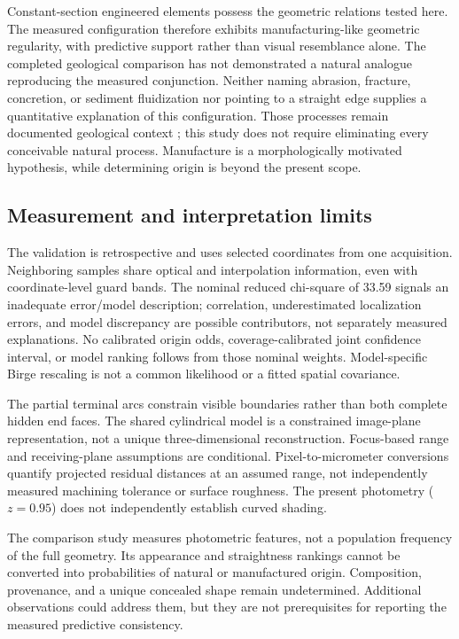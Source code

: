 \documentclass[11pt,letterpaper]{article}
\begin{document}
Constant-section engineered elements possess the geometric relations tested here. The measured configuration therefore exhibits manufacturing-like geometric regularity, with predictive support rather than visual resemblance alone. The completed geological comparison has not demonstrated a natural analogue reproducing the measured conjunction. Neither naming abrasion, fracture, concretion, or sediment fluidization nor pointing to a straight edge supplies a quantitative explanation of this configuration. Those processes remain documented geological context \cite{bridges2014,loope2011,rubin2017,chan2004,wiens2017}; this study does not require eliminating every conceivable natural process. Manufacture is a morphologically motivated hypothesis, while determining origin is beyond the present scope.

\subsection{Measurement and interpretation limits}
\label{sec:limits}

The validation is retrospective and uses selected coordinates from one acquisition. Neighboring samples share optical and interpolation information, even with coordinate-level guard bands. The nominal reduced chi-square of 33.59 signals an inadequate error/model description; correlation, underestimated localization errors, and model discrepancy are possible contributors, not separately measured explanations. No calibrated origin odds, coverage-calibrated joint confidence interval, or model ranking follows from those nominal weights. Model-specific Birge rescaling is not a common likelihood or a fitted spatial covariance.

The partial terminal arcs constrain visible boundaries rather than both complete hidden end faces. The shared cylindrical model is a constrained image-plane representation, not a unique three-dimensional reconstruction. Focus-based range and receiving-plane assumptions are conditional. Pixel-to-micrometer conversions quantify projected residual distances at an assumed range, not independently measured machining tolerance or surface roughness. The present photometry ($z=0.95$) does not independently establish curved shading.

The comparison study measures photometric features, not a population frequency of the full geometry. Its appearance and straightness rankings cannot be converted into probabilities of natural or manufactured origin. Composition, provenance, and a unique concealed shape remain undetermined. Additional observations could address them, but they are not prerequisites for reporting the measured predictive consistency.
\end{document}
